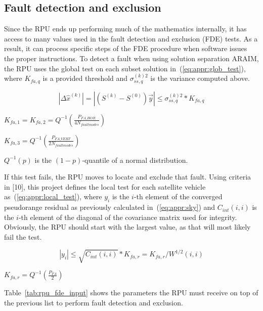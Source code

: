 \documentclass[11pt]{article}
\begin{document}
\subsection{Fault detection and exclusion}

Since the RPU ends up performing much of the mathematics internally, it has access to many values used in the fault detection and exclusion (FDE) tests. As a result, it can process specific steps of the FDE procedure when software issues the proper instructions. To detect a fault when using solution separation ARAIM, the RPU uses the global test on each subset solution in~(\ref{eq:appr:glob_test}), where $K_{fa,q}$ is a provided threshold and $\sigma_{ss,q}^{(k)2}$ is the variance computed above.

\begin{equation}
    \label{eq:appr:glob_test}
    |\Delta \hat{x}^{(k)}| = |(S^{(k)} - S^{(0)})\vec{y}| \le \sigma_{ss,q}^{(k)2} * K_{fa,q}
\end{equation}

$K_{fa,1} = K_{fa,2} = Q^{-1}(\frac{P_{FA\_HOR}}{4N_{fault modes}})$

$K_{fa,3} = Q^{-1}(\frac{P_{FA\_VERT}}{2N_{fault modes}})$

$Q^{-1}(p)$ is the $(1-p)$-quantile of a normal distribution.

If this test fails, the RPU moves to locate and exclude that fault. Using criteria in [10], this project defines the local test for each satellite vehicle as~(\ref{eq:appr:local_test}), where $y_i$ is the $i$-th element of the converged pseudorange residual as previously calculated in~(\ref{eq:appr:sky}) and $C_{int}(i,i)$ is the $i$-th element of the diagonal of the covariance matrix used for integrity. Obviously, the RPU should start with the largest value, as that will most likely fail the test.

\begin{equation}
    \label{eq:appr:local_test}
    |y_i| \le \sqrt{C_{int}(i,i)} * K_{fa,r} = K_{fa,r} / W^{1/2}(i,i)
\end{equation}

$K_{fa,r} = Q^{-1}(\frac{P_{FA}}{2})$

Table~\ref{tab:rpu_fde_input} shows the parameters the RPU must receive on top of the previous list to perform fault detection and exclusion.
\end{document}
